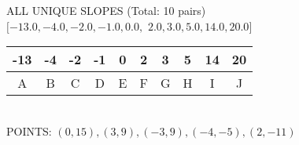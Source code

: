 \documentclass[12pt]{article}
\begin{document}
  

\noindent
ALL UNIQUE SLOPES (Total: 10 pairs)
\\
$[-13.0, -4.0, -2.0, -1.0,  0.0, $
$   2.0,  3.0,  5.0, 14.0, 20.0]$

\noindent
\begin{tabular}{ |c|c|c|c|c|c|c|c|c|c| } 
 \hline
 -13 & -4 & -2 & -1 & 0 & 2 & 3 & 5 & 14 & 20 \\
 \hline
 A & B & C & D & E & F & G & H & I & J  \\ 
 \hline
\end{tabular}     
\\
\noindent
POINTS: $(0,15),(3,9),(-3,9),(-4,-5),(2,-11)$
\end{document}
